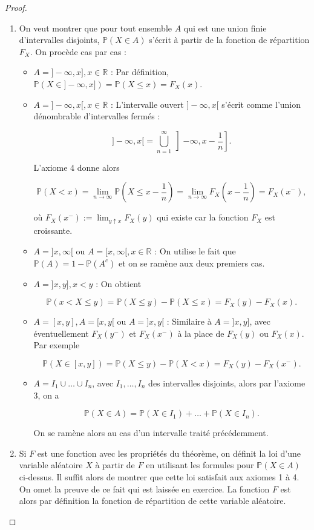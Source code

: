 \begin{proof}
\begin{enumerate}
\begin{itemize}
Cela donne que $F_X(x^+) = \mathbb{P}(X \in ]-\infty, x]) = F_X(x)$ et donc $F_X$ est continue à droite en $x$. Puisque $x \in \mathbb{R}$ était arbitraire, $F_X$ est continue à droite sur $\mathbb{R}$.
\end{itemize}
\item On veut montrer que pour tout ensemble $A$ qui est une union finie d'intervalles disjoints, $\mathbb{P}(X \in A)$ s'écrit à partir de la fonction de répartition $F_X$. On procède cas par cas :
\begin{itemize}
\item $A = ]-\infty, x], x \in \mathbb{R}$ : Par définition, $\mathbb{P}(X \in ]-\infty, x]) = \mathbb{P}(X \leq x) = F_X(x)$.
\item $A = ]-\infty, x[, x \in \mathbb{R}$ : L'intervalle ouvert $]-\infty, x[$ s'écrit comme l'union dénombrable d'intervalles fermés :

$$
]-\infty, x[ = \bigcup_{n=1}^\infty \left]-\infty, x - \frac{1}{n}\right].
$$

L'axiome 4 donne alors

$$
\mathbb{P}(X < x) = \lim_{n \to \infty} \mathbb{P}\left(X \leq x - \frac{1}{n}\right) = \lim_{n \to \infty} F_X\left(x - \frac{1}{n}\right) = F_X(x^-),
$$

où $F_X(x^-) := \lim_{y \uparrow x} F_X(y)$ qui existe car la fonction $F_X$ est croissante.
\item $A = ]x, \infty[$ ou $A = [x, \infty[, x \in \mathbb{R}$ : On utilise le fait que $\mathbb{P}(A) = 1 - \mathbb{P}(A^c)$ et on se ramène aux deux premiers cas.
\item $A = ]x, y], x < y$ : On obtient

$$
\mathbb{P}(x < X \leq y) = \mathbb{P}(X \leq y) - \mathbb{P}(X \leq x) = F_X(y) - F_X(x).
$$
\item $A = [x, y], A = [x, y[$ ou $A = ]x, y[$ : Similaire à $A = ]x, y]$, avec éventuellement $F_X(y^-)$ et $F_X(x^-)$ à la place de $F_X(y)$ ou $F_X(x)$. Par exemple

$$
\mathbb{P}(X \in [x, y]) = \mathbb{P}(X \leq y) - \mathbb{P}(X < x) = F_X(y) - F_X(x^-).
$$
\item  $A = I_1 \cup \dots \cup I_n$, avec $I_1, \dots, I_n$ des intervalles disjoints, alors par l'axiome 3, on a

$$
\mathbb{P}(X \in A) = \mathbb{P}(X \in I_1) + \dots + \mathbb{P}(X \in I_n).
$$

On se ramène alors au cas d'un intervalle traité précédemment.
\end{itemize}
\item Si $F$ est une fonction avec les propriétés du théorème, on définit la loi d'une variable aléatoire $X$ à partir de $F$ en utilisant les formules pour $\mathbb{P}(X \in A)$ ci-dessus. Il suffit alors de montrer que cette loi satisfait aux axiomes 1 à 4. On omet la preuve de ce fait qui est laissée en exercice. La fonction $F$ est alors par définition la fonction de répartition de cette variable aléatoire.
\end{enumerate}
\end{proof}

